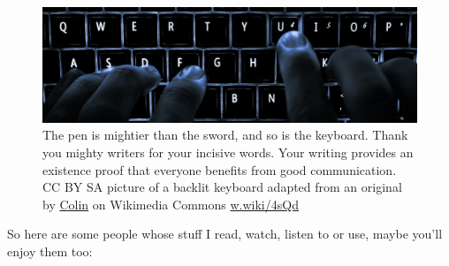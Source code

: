 \documentclass[
]{book}
\begin{document}
\begin{figure}

{\centering \includegraphics[width=1\linewidth]{images/keyboard} 

}

\caption{The pen is mightier than the sword, and so is the keyboard. Thank you mighty writers for your incisive words. Your writing provides an existence proof that everyone benefits from good communication. CC BY SA picture of a backlit keyboard adapted from an original by \href{https://commons.wikimedia.org/wiki/User:Colin}{Colin} on Wikimedia Commons \href{https://w.wiki/4sQd}{w.wiki/4sQd}}\label{fig:keyboard-fig}
\end{figure}



So here are some people whose stuff I read, watch, listen to or use, maybe you'll enjoy them too:
\end{document}
